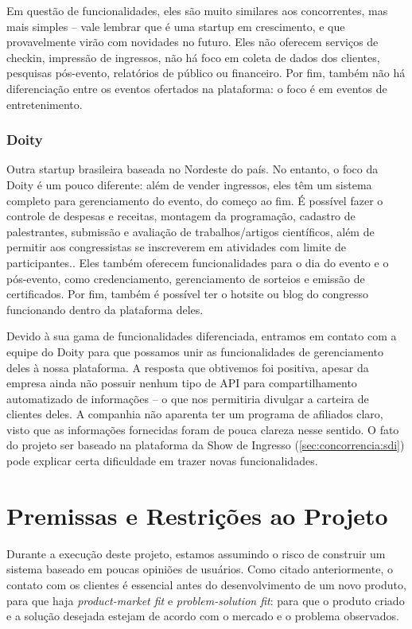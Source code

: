 \documentclass[12pt,a4paper,twoside,hyphens,english,brazil]{abntex2}
\begin{document}
Em questão de funcionalidades, eles são muito similares aos concorrentes, mas mais simples -- vale lembrar que é uma startup em crescimento, e que provavelmente virão com novidades no futuro. Eles não oferecem serviços de checkin, impressão de ingressos,  não há foco em coleta de dados dos clientes, pesquisas pós-evento, relatórios de público ou financeiro. Por fim, também não há diferenciação entre os eventos ofertados na plataforma: o foco é em eventos de entretenimento.

\subsubsection*{Doity}
Outra startup brasileira baseada no Nordeste do país. No entanto, o foco da Doity é um pouco diferente: além de vender ingressos, eles têm um sistema completo para gerenciamento do evento, do começo ao fim. É possível fazer o controle de despesas e receitas, montagem da programação, cadastro de palestrantes, submissão e avaliação de trabalhos/artigos científicos, além de permitir aos congressistas se inscreverem em atividades com limite de participantes.\cite{doity-como-funciona}. Eles também oferecem funcionalidades para o dia do evento e o pós-evento, como credenciamento, gerenciamento de sorteios e emissão de certificados. Por fim, também é possível ter o hotsite ou blog do congresso funcionando dentro da plataforma deles.

Devido à sua gama de funcionalidades diferenciada, entramos em contato com a equipe do Doity para que possamos unir as funcionalidades de gerenciamento deles à nossa plataforma. A resposta que obtivemos foi positiva, apesar da empresa ainda não possuir nenhum tipo de API para compartilhamento automatizado de informações -- o que nos permitiria divulgar a carteira de clientes deles. A companhia não aparenta ter um programa de afiliados claro, visto que as informações fornecidas foram de pouca clareza nesse sentido. O fato do projeto ser baseado na plataforma da Show de Ingresso (\autoref{sec:concorrencia:sdi}) pode explicar certa dificuldade em trazer novas funcionalidades.


\section{Premissas e Restrições ao Projeto} \label{sec:premissas}

Durante a execução deste projeto, estamos assumindo o risco de construir um sistema baseado em poucas opiniões de usuários. Como citado anteriormente, o contato com os clientes é essencial antes do desenvolvimento de um novo produto, para que haja \emph{product-market fit} e \emph{problem-solution fit}: para que o produto criado e a solução desejada estejam de acordo com o mercado e o problema observados.\cite{bootstrapping}
\end{document}
